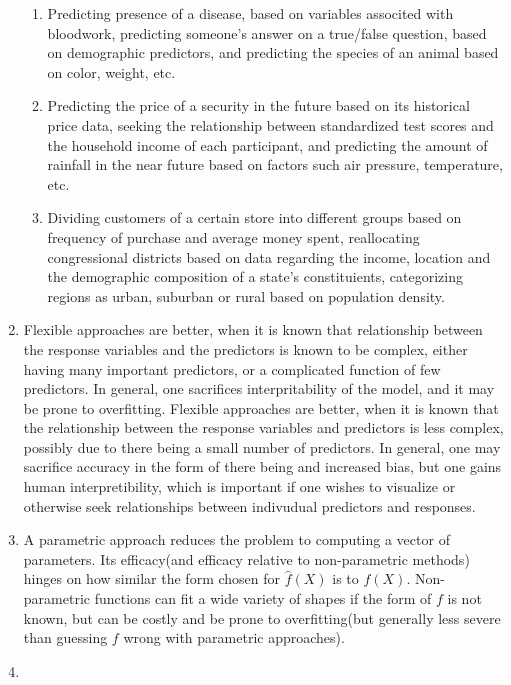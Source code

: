 \documentclass[11pt]{article}
\begin{document}
\begin{enumerate}
{\begin{enumerate}
			\item{Predicting presence of a disease, based on variables associted with bloodwork, predicting someone's answer on a true/false question, based on demographic predictors, and predicting the species of an animal based on color, weight, etc.}
			\item{Predicting the price of a security in the future based on its historical price data, seeking the relationship between standardized test scores and the household income of each participant, and predicting the amount of rainfall in the near future based on factors such air pressure, temperature, etc.}
			\item{Dividing customers of a certain store into different groups based on frequency of purchase and average money spent, reallocating congressional districts based on data regarding the income, location and the demographic composition of a state's constituients, categorizing regions as urban, suburban or rural based on population density.}
			
		\end{enumerate}
	}
	
	\item{Flexible approaches are better, when it is known that relationship between the response variables and the predictors is known to be complex, either having many important predictors, or a complicated function of few predictors. In general, one sacrifices interpritability of the model, and it may be prone to overfitting.  Flexible approaches are better, when it is known that the relationship between the response variables and predictors is less complex, possibly due to there being a small number of predictors. In general, one may sacrifice accuracy in the form of there being and increased bias, but one gains human interpretibility, which is important if one wishes to visualize or otherwise seek relationships between indivudual predictors and responses.}
	
	\item{A parametric approach reduces the problem to computing a vector of parameters. Its efficacy(and efficacy relative to non-parametric methods) hinges on how similar the form chosen for $\hat{f}(X)$ is to $f(X)$. Non-parametric functions can fit a wide variety of shapes if the form of $f$ is not known, but can be costly and be prone to overfitting(but generally less severe than guessing $f$ wrong with parametric approaches).}
	
	\item{
	
}
\end{enumerate}
\end{document}

